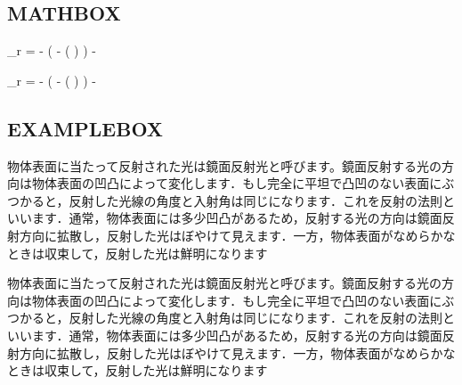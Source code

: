 \documentclass[../main]{subfiles}
\begin{document}
\leaderfill

\subsection{MATHBOX}
\begin{MATHBOX}
    \vec{\omega}_{r} = 
    - \left(
        \vec{\omega} - (\vec{\omega} \cdot {}) 
    \right)
    - 
\end{MATHBOX}
\begin{code}[language=tex]
\begin{MATHBOX}
    \vec{\omega}_{r} = 
    - \left(
        \vec{\omega} - (\vec{\omega} \cdot {}) 
    \right)
    - 
\end{MATHBOX}
\end{code}

\leaderfill

\subsection{EXAMPLEBOX}
\begin{EXAMPLEBOX}[鏡面反射光]
    物体表面に当たって反射された光は鏡面反射光と呼びます。鏡面反射する光の方向は物体表面の凹凸によって変化します．もし完全に平坦で凸凹のない表面にぶつかると，反射した光線の角度と入射角は同じになります．これを反射の法則といいます．通常，物体表面には多少凹凸があるため，反射する光の方向は鏡面反射方向に拡散し，反射した光はぼやけて見えます．一方，物体表面がなめらかなときは収束して，反射した光は鮮明になります
\end{EXAMPLEBOX}
\begin{code}[language=tex]
\begin{EXAMPLEBOX}[鏡面反射光]
    物体表面に当たって反射された光は鏡面反射光と呼びます。鏡面反射する光の方向は物体表面の凹凸によって変化します．もし完全に平坦で凸凹のない表面にぶつかると，反射した光線の角度と入射角は同じになります．これを反射の法則といいます．通常，物体表面には多少凹凸があるため，反射する光の方向は鏡面反射方向に拡散し，反射した光はぼやけて見えます．一方，物体表面がなめらかなときは収束して，反射した光は鮮明になります
\end{EXAMPLEBOX}
\end{code}
\end{document}
